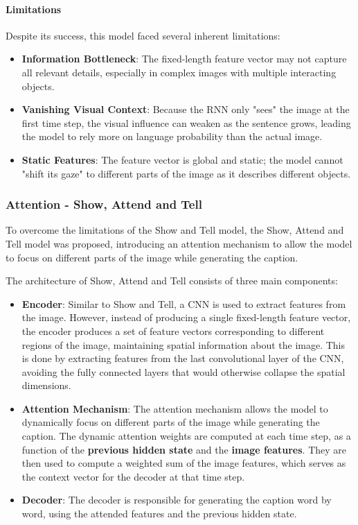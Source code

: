 \paragraph{Limitations}
Despite its success, this model faced several inherent limitations:
\begin{itemize}
    \item \textbf{Information Bottleneck}: The fixed-length feature vector may not capture all relevant details, especially in complex images with multiple interacting objects.
    \item \textbf{Vanishing Visual Context}: Because the RNN only "sees" the image at the first time step, the visual influence can weaken as the sentence grows, leading the model to rely more on language probability than the actual image.
    \item \textbf{Static Features}: The feature vector is global and static; the model cannot "shift its gaze" to different parts of the image as it describes different objects.
\end{itemize}

\subsubsection{Attention - Show, Attend and Tell}
To overcome the limitations of the Show and Tell model, the Show, Attend and Tell model was proposed, introducing an attention mechanism 
to allow the model to focus on different parts of the image while generating the caption.

The architecture of Show, Attend and Tell consists of three main components:
\begin{itemize}
    \item \textbf{Encoder}: Similar to Show and Tell, a CNN is used to extract features from the image. 
    However, instead of producing a single fixed-length feature vector, the encoder produces a set of feature vectors corresponding to different regions of the image,
    maintaining spatial information about the image. This is done by extracting features from the last convolutional layer of the CNN,
    avoiding the fully connected layers that would otherwise collapse the spatial dimensions.
    \item \textbf{Attention Mechanism}: The attention mechanism allows the model to dynamically focus on different parts of the image while generating the caption.
    The dynamic attention weights are computed at each time step, as a function of the \textbf{previous hidden state} and the \textbf{image features}.
    They are then used to compute a weighted sum of the image features, which serves as the context vector for the decoder at that time step.
    \item \textbf{Decoder}: The decoder is responsible for generating the caption word by word, using the attended features and the previous hidden state.
\end{itemize}

